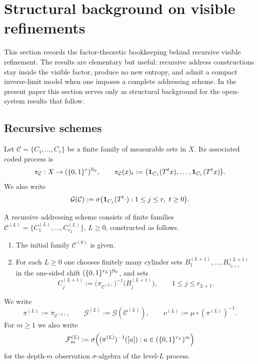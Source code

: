 \section{Structural background on visible refinements}
\label{sec:recursive-addressing}

This section records the factor-theoretic bookkeeping behind recursive
visible refinement.  The results are elementary but useful: recursive
address constructions stay inside the visible factor, produce no new
entropy, and admit a compact inverse-limit model when one imposes a
complete addressing scheme.  In the present paper this section serves
only as structural background for the open-system results that follow.

\subsection{Recursive schemes}

Let \(\mathcal{C}=\{C_1,\ldots,C_r\}\) be a finite family of measurable
sets in \(X\).  Its associated coded process is
\[
  \pi_{\mathcal{C}}:X\to (\{0,1\}^r)^{\mathbb{N}_0},
  \qquad
  \pi_{\mathcal{C}}(x)_t
  := \bigl(\mathbf{1}_{C_1}(T^t x),\ldots,\mathbf{1}_{C_r}(T^t x)\bigr).
\]
We also write
\[
  \mathcal{G}(\mathcal{C})
  := \sigma\bigl(\mathbf{1}_{C_j}(T^t\cdot):
      1\leq j\leq r,\ t\geq 0\bigr).
\]

\begin{definition}
\label{def:recursive-scheme}
A recursive addressing scheme consists of finite families
\(\mathcal{C}^{(L)}=\{C^{(L)}_1,\ldots,C^{(L)}_{r_L}\}\), \(L\geq 0\),
constructed as follows.
\begin{enumerate}
  \item The initial family \(\mathcal{C}^{(0)}\) is given.
  \item For each \(L\geq 0\) one chooses finitely many cylinder sets
    \(B^{(L+1)}_1,\ldots,B^{(L+1)}_{r_{L+1}}\) in the one-sided shift
    \((\{0,1\}^{r_L})^{\mathbb{N}_0}\), and sets
    \[
      C^{(L+1)}_j
      := \bigl(\pi_{\mathcal{C}^{(L)}}\bigr)^{-1}
          \bigl(B^{(L+1)}_j\bigr),
      \qquad 1\leq j\leq r_{L+1}.
    \]
\end{enumerate}
We write
\[
  \pi^{(L)}:=\pi_{\mathcal{C}^{(L)}},
  \qquad
  \mathcal{G}^{(L)}:=\mathcal{G}(\mathcal{C}^{(L)}),
  \qquad
  \nu^{(L)} := \mu\circ(\pi^{(L)})^{-1}.
\]
For \(m\geq 1\) we also write
\[
  \mathcal{F}_m^{(L)}
  := \sigma\Bigl(
      (\pi^{(L)})^{-1}([a]):
      a\in(\{0,1\}^{r_L})^m
     \Bigr)
\]
for the depth-\(m\) observation \(\sigma\)-algebra of the level-\(L\)
process.
\end{definition}

